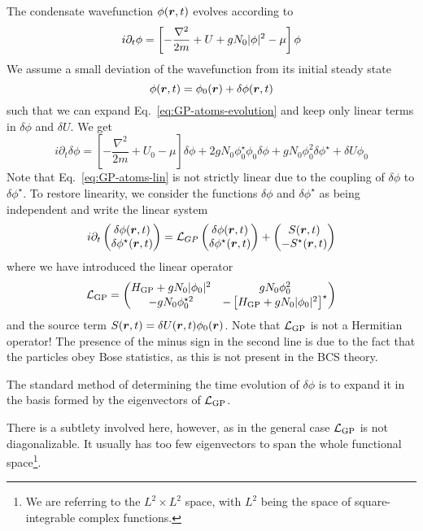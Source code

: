 The condensate wavefunction $\phi(\bm{r},t)$ evolves according to
%
\begin{equation}\label{eq:GP-atoms-evolution}
  i\partial_t \phi = \left[-\frac{\nabla^2}{2m} + U + gN_0 \vert \phi \vert^2 - \mu\right] \phi
\end{equation}
% 
We assume a small deviation of the wavefunction from its initial
steady state
%
\begin{equation}\label{eq:ansatz-atoms}
  \phi(\bm{r},t) = \phi_0(\bm{r}) + \delta\phi(\bm{r},t)
\end{equation}
% 
such that we can expand Eq.~\eqref{eq:GP-atoms-evolution} and keep only linear terms in $\delta\phi$ and $\delta U$. We get
%
\begin{equation}\label{eq:GP-atoms-lin}
  i\partial_t\delta\phi =  \left[-\frac{\nabla^2}{2m} + U_0-\mu\right]
  \delta\phi + 2 g N_0 \phi_0^{\star}\phi_0\delta\phi + gN_0\phi_0^2\delta\phi^{\star}
  +\delta U\phi_0
\end{equation}
% 
Note that Eq.~\eqref{eq:GP-atoms-lin} is not strictly linear due to
the coupling of $\delta\phi$ to $\delta\phi^{\star}$. To restore
linearity, we consider the functions $\delta\phi$ and
$\delta\phi^{\star}$ as being independent and write the linear system
%
\begin{equation}\label{eq:GP-atoms-system}
  i \partial_t \begin{pmatrix} \delta\phi(\bm{r},t)\\ \delta\phi^{\star}(\bm{r},t) \end{pmatrix}
  = \mathcal{L}_{GP} \begin{pmatrix} \delta\phi(\bm{r},t)\\ \delta\phi^{\star}(\bm{r},t) \end{pmatrix}
  + \begin{pmatrix} S(\bm{r},t)\\ -S^{\star}(\bm{r},t) \end{pmatrix}
\end{equation}
% 
where we have introduced the linear operator
%
\begin{equation}\label{eq:LGP}
  \mathcal{L}_{\text{GP}} = \begin{pmatrix} H_{\text{GP}}+gN_0\vert \phi_0 \vert^2 & g N_0 \phi_0^2\\ -g N_0 \phi_0^{\star 2} & -\left[H_{\text{GP}}+gN_0\vert \phi_0 \vert^2\right]^{\star} \end{pmatrix}
\end{equation}
% 
and the source term $S(\bm{r},t)=\delta U(\bm{r},t)\phi_0(\bm{r})$.  Note that
$\mathcal{L}_{\text{GP}}$ is not a Hermitian operator! The presence of the minus
sign in the second line is due to the fact that the particles obey
Bose statistics, as this is not present in the BCS theory.

The standard method of determining the time evolution of $\delta\phi$
is to expand it in the basis formed by the eigenvectors of
$\mathcal{L}_{\text{GP}}$.

There is a subtlety involved here, however, as in the general case
$\mathcal{L}_{\text{GP}}$ is not diagonalizable. It usually has too few
eigenvectors to span the whole functional space\footnote{We are
  referring to the $L^2 \times L^2$ space, with $L^2$ being the space
  of square-integrable complex functions.}.

